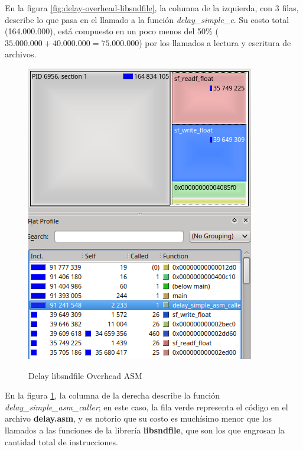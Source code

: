 En la figura \ref{fig:delay-overhead-libsndfile}, la columna de la izquierda, con 3 filas, describe lo que pasa en el llamado a la función \textit{delay\_simple\_c}. Su costo total (164.000.000), está compuesto en un poco menos del 50\% ($35.000.000+40.000.000 = 75.000.000$) por los llamados a lectura y escritura de archivos.

\begin{figure}[H]
    \centering
    \includegraphics[scale=0.68]{imagenes/delay-overhead-libsndfile-asm.png}
    \label{fig:delay-overhead-libsndfile-asm}
    \caption{Delay libsndfile Overhead ASM}
\end{figure}

En la figura \ref{fig:delay-overhead-libsndfile-asm}, la columna de la derecha describe la función \textit{delay\_simple\_asm\_caller}; en este caso, la fila verde representa el código en el archivo \textbf{delay.asm}, y es notorio que su costo es muchísimo menor que los llamados a las funciones de la librería \textbf{libsndfile}, que son los que engrosan la cantidad total de instrucciones. 

